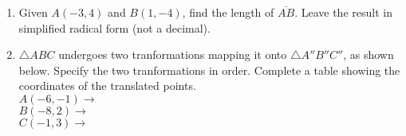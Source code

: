 \documentclass[12pt, twoside]{article}
\begin{document}
\begin{enumerate}
  \item Given $A(-3,4)$ and $B(1,-4)$, find the length of $\overline{AB}$. Leave the result in simplified radical form (not a decimal).
      \vspace{4cm}

\newpage

  \item $\triangle ABC$ undergoes two tranformations mapping it onto $\triangle A''B''C''$, as shown below. Specify the two tranformations in order. Complete a table showing the coordinates of the translated points.\\[2cm]
   \hspace{1cm} $A(-6,-1) \rightarrow$\\[1cm]
   \hspace{1cm} $B(-8,2) \rightarrow$\\[1cm]
   \hspace{1cm} $C(-1,3) \rightarrow$

    \vspace{1.5cm}

      \begin{center} %
      \end{center}

  \end{enumerate}

  
\end{document}
